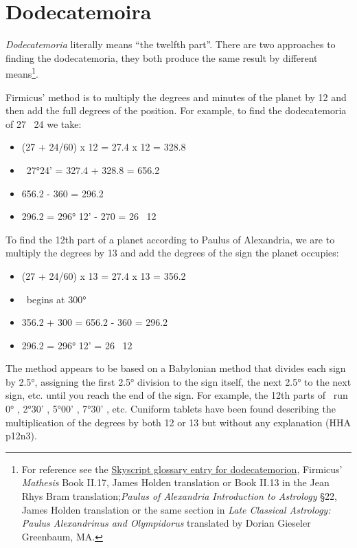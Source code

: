 \chapter{Dodecatemoira}
\label{appendix:dodecatemoria}

\textsl{Dodecatemoria} literally means ``the twelfth part''. There are two approaches to finding the dodecatemoria, they both produce the same result by different means\footnote{For reference see the \href{https://www.skyscript.co.uk/gl/dodekatemorion.html}{Skyscript glossary entry for dodecatemorion}, Firmicus' \textsl{Mathesis} Book II.17, James Holden translation or Book II.13 in the Jean Rhys Bram translation;\textsl{Paulus of Alexandria Introduction to Astrology} \S{22}, James Holden translation or the same section in \textsl{Late Classical Astrology: Paulus Alexandrinus and Olympidorus} translated by Dorian Gieseler Greenbaum, MA.}.

Firmicus' method is to multiply the degrees and minutes of the planet  by 12 and then add the full degrees of the position. For example, to find the dodecatemoria of 27 \Aquarius\, 24 we take:
\begin{itemize}
\item[] (27 + 24/60) x 12 = 27.4 x 12 = 328.8
\item[] \Aquarius\, 27°24' = 327.4 + 328.8 = 656.2
\item[] 656.2 - 360 = 296.2
\item[] 296.2 = 296° 12' - 270 = 26 \Capricorn\, 12
\end{itemize}

To find the 12th part of a planet according to Paulus of Alexandria, we  are to  multiply the degrees by 13 and add the degrees of the sign the planet occupies:
\begin{itemize}
\item[] (27 + 24/60) x 13 = 27.4 x 13 = 356.2
\item[] \Aquarius\, begins at 300°
\item[] 356.2 + 300 = 656.2 - 360 = 296.2
\item[] 296.2 = 296° 12' = 26 \Capricorn\, 12
\end{itemize}

The method appears to be based on a Babylonian method that divides each sign by  2.5°, assigning the first 2.5° division to the sign itself, the next 2.5° to the next sign, etc. until you reach the end of the sign. For example, the 12th parts of \Libra\, run 0° \Libra, 2°30' \Scorpio, 5°00' \Sagittarius, 7°30' \Capricorn, etc.  Cuniform tablets have been found describing the multiplication of the degrees by both 12 or 13 but without any explanation (HHA p12n3). 

